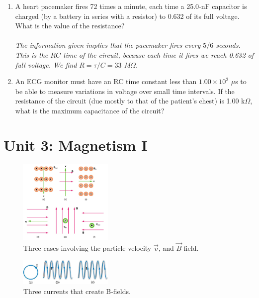 \documentclass[12pt,twocolumn]{article}
\begin{document}
\begin{enumerate}
\item A heart pacemaker fires 72 times a minute, each time a 25.0-nF capacitor is charged (by a battery in series with a resistor) to 0.632 of its full voltage. What is the value of the resistance? \\ \\
\textit{The information given implies that the pacemaker fires every $5/6$ seconds.  This is the $RC$ time of the circuit, because each time it fires we reach 0.632 of full voltage.  We find $R = \tau/C = 33$ M$\Omega$.}
\item An ECG monitor must have an RC time constant less than $1.00 \times 10^2$ $\mu$s to be able to measure variations in voltage over small time intervals. If the resistance of the circuit (due mostly to that of the patient’s chest) is 1.00 k$\Omega$, what is the maximum capacitance of the circuit? \\
\end{enumerate}

\section{Unit 3: Magnetism I}
\begin{figure}
\centering
\includegraphics[width=0.4\textwidth,trim=0cm 2.8cm 0cm 0cm,clip=true]{Bfield.jpeg}
\caption{\label{fig:B} Three cases involving the particle velocity $\vec{v}$, and $\vec{B}$ field.}
\end{figure}
\begin{figure}
\centering
\includegraphics[width=0.4\textwidth]{coils.jpeg}
\caption{\label{fig:B2} Three currents that create B-fields.}
\end{figure}
\end{document}
